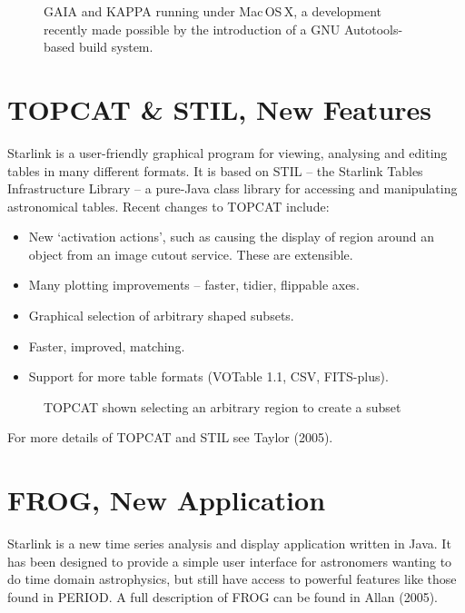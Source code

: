 \documentclass[11pt,twoside]{article}  %
\begin{document}
\begin{figure}
\caption{GAIA and KAPPA running under Mac\,OS\,X, a development recently made
possible by the introduction of a GNU Autotools-based build system.}
\end{figure}

\section{TOPCAT \& STIL, New Features}

Starlink  
is a user-friendly graphical program for viewing, analysing
and editing tables in many different formats. It is based on STIL --
the Starlink Tables Infrastructure Library -- a pure-Java class library for
accessing and manipulating astronomical tables. Recent changes to
TOPCAT include:
\begin{itemize}
\item New `activation actions', such as causing the display of region around
      an object from an image cutout service. These are extensible.
\item Many plotting improvements -- faster, tidier, flippable axes.
\item Graphical selection of arbitrary shaped subsets.
\item Faster, improved, matching.
\item Support for more table formats (VOTable 1.1, CSV, FITS-plus).
\end{itemize}

\begin{figure}
\caption{TOPCAT shown selecting an arbitrary region to create a subset}
\end{figure}

For more details of TOPCAT and STIL see Taylor (2005).

\section{FROG, New Application}

Starlink  is a new
time series analysis and display application written in Java. It has been
designed to provide a simple user interface for astronomers wanting to do time
domain astrophysics, but still have access to powerful features like those
found in PERIOD. A full description of FROG can be found in Allan (2005).
\end{document}
